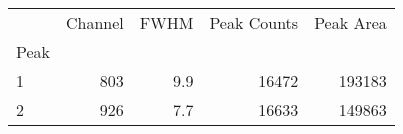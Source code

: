 \begin{tabular}{lrrrr}
\toprule
{} &  Channel &  FWHM &  Peak Counts &  Peak Area \\
Peak &          &       &              &            \\
\midrule
1    &      803 &   9.9 &        16472 &     193183 \\
2    &      926 &   7.7 &        16633 &     149863 \\
\bottomrule
\end{tabular}
